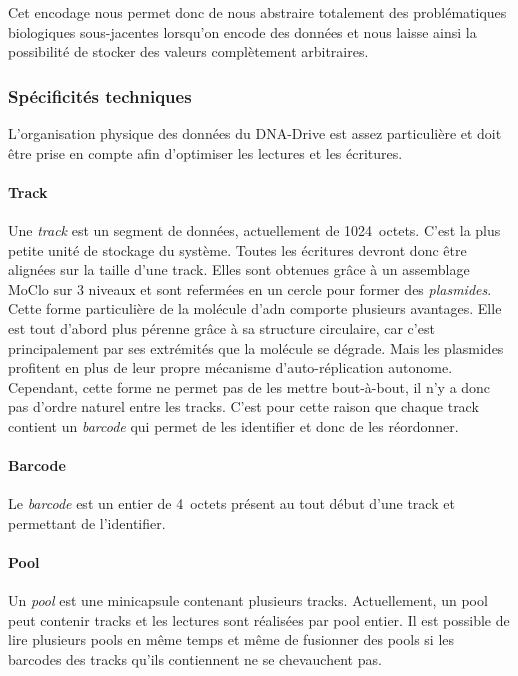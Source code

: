 \documentclass[a4paper]{report}
\begin{document}
Cet encodage nous permet donc de nous abstraire totalement des problématiques biologiques sous-jacentes lorsqu'on encode des données
et nous laisse ainsi la possibilité de stocker des valeurs complètement arbitraires.

\subsubsection{Spécificités techniques}

L'organisation physique des données du DNA-Drive est assez particulière et doit être prise en compte afin d'optimiser les lectures et les écritures.

\paragraph{Track} Une \emph{track} est un segment de données, actuellement de 1024~octets.
C'est la plus petite unité de stockage du système.
Toutes les écritures devront donc être alignées sur la taille d'une track.
Elles sont obtenues grâce à un assemblage MoClo \cite{werner2012fast} sur 3 niveaux
et sont refermées en un cercle pour former des \emph{plasmides}.
Cette forme particulière de la molécule d'\ac{adn} comporte plusieurs avantages.
Elle est tout d'abord plus pérenne grâce à sa structure circulaire,
car c'est principalement par ses extrémités que la molécule se dégrade.
Mais les plasmides profitent en plus de leur propre mécanisme d'auto-réplication autonome.
Cependant, cette forme ne permet pas de les mettre bout-à-bout,
il n'y a donc pas d'ordre naturel entre les tracks.
C'est pour cette raison que chaque track contient un \emph{barcode} qui permet de les identifier et donc de les réordonner.

\paragraph{Barcode} Le \emph{barcode} est un entier de 4~octets présent au tout début d'une track et permettant de l'identifier.

\paragraph{Pool} Un \emph{pool} est une minicapsule contenant plusieurs tracks.
Actuellement, un pool peut contenir  tracks et les lectures sont réalisées par pool entier.
Il est possible de lire plusieurs pools en même temps
et même de fusionner des pools si les barcodes des tracks qu'ils contiennent ne se chevauchent pas.
\end{document}
